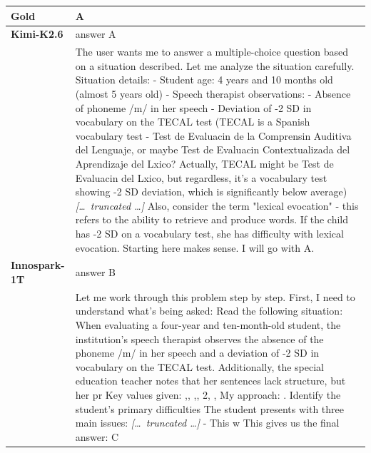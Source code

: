 \begin{longtable}{@{}l p{12.5cm}@{}}
  \textbf{Gold} & A \\
  \midrule
  \textbf{Kimi-K2.6} & answer A \\
  & The user wants me to answer a multiple-choice question based on a situation described. Let me analyze the situation carefully. \newline Situation details: \newline - Student age: 4 years and 10 months old (almost 5 years old) \newline - Speech therapist observations: \newline - Absence of phoneme /m/ in her speech \newline - Deviation of -2 SD in vocabulary on the TECAL test (TECAL is a Spanish vocabulary test - Test de Evaluacin de la Comprensin Auditiva del Lenguaje, or maybe Test de Evaluacin Contextualizada del Aprendizaje del Lxico? Actually, TECAL might be Test de Evaluacin del Lxico, but regardless, it's a vocabulary test showing -2 SD deviation, which is significantly below average) \newline \textit{[\ldots\ truncated \ldots]} \newline Also, consider the term "lexical evocation" - this refers to the ability to retrieve and produce words. If the child has -2 SD on a vocabulary test, she has difficulty with lexical evocation. Starting here makes sense. \newline I will go with A. \\
  \textbf{Innospark-1T} & answer B \\
  & Let me work through this problem step by step. \newline First, I need to understand what's being asked: Read the following situation: When evaluating a four-year and ten-month-old student, the institution's speech therapist observes the absence of the phoneme /m/ in her speech and a deviation of -2 SD in vocabulary on the TECAL test. Additionally, the special education teacher notes that her sentences lack structure, but her pr \newline Key values given: ,, ,, 2, , \newline My approach: \newline 1. Identify the student's primary difficulties \newline The student presents with three main issues: \newline \textit{[\ldots\ truncated \ldots]} \newline - This w \newline This gives us the final answer: C \\

\end{longtable}
